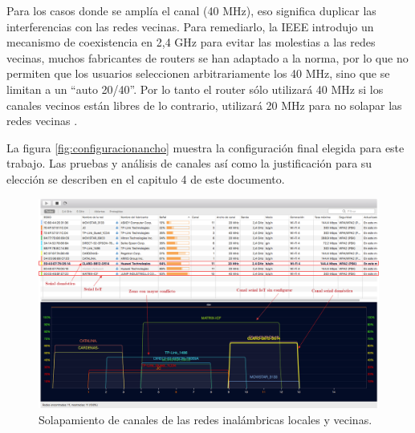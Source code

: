 Para los casos donde se amplía el canal (40 MHz), eso significa duplicar las interferencias con las redes vecinas. Para remediarlo, la IEEE introdujo un mecanismo de coexistencia en 2,4 GHz para evitar las molestias a las redes vecinas, muchos fabricantes de routers se han adaptado a la norma, por lo que no permiten que los usuarios seleccionen arbitrariamente los 40 MHz, sino que se limitan a un ``auto 20/40''. Por lo tanto el router sólo utilizará 40 MHz si los canales vecinos están libres de lo contrario, utilizará 20 MHz para no solapar las redes vecinas \citep{WEBSITE:30}.

La figura \ref{fig:configuracionancho} muestra la configuración final elegida para este trabajo. Las pruebas y análisis de canales así como la justificación para su elección se describen en el capitulo 4 de este documento.

\begin{landscape} %
\begin{figure}[htpb]
\centering 
\includegraphics[width=1.5\textwidth]{./Figures/wifi/01-doc.png}
\caption{Solapamiento de canales de las redes inalámbricas locales y vecinas.}
\label{fig:solapamiento}
\end{figure}
\end{landscape} %

